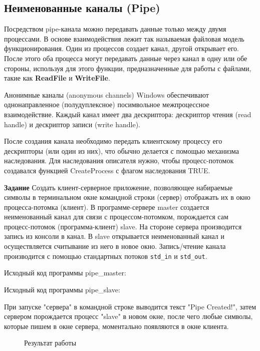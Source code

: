 \documentclass[a4paper]{article}
\begin{document}
\subsection{Неименованные каналы (Pipe)}
	Посредством pipe-канала можно передавать данные только между двумя процессами. В основе взаимодействия лежит так называемая файловая модель функционирования. Один из процессов создает канал, другой открывает его. После этого оба процесса могут передавать данные через канал в одну или обе стороны, используя для этого функции, предназначенные для работы с файлами, такие как \textbf{ReadFile} и \textbf{WriteFile}.
	
	Анонимные каналы (anonymous channels) Windows обеспечивают однонаправленное (полудуплексное) посимвольное межпроцессное взаимодействие. Каждый канал имеет два дескриптора: дескриптор чтения (read handle) и дескриптор записи (write handle).
	
	После создания канала необходимо передать клиентскому процессу его дескрипторы (или один из них), что обычно делается с помощью механизма наследования. Для наследования описателя нужно, чтобы процесс-потомок создавался функцией CreateProcess с флагом наследования TRUE.
	
	\textbf{Задание} Создать клиент-серверное приложение, позволяющее набираемые символы в терминальном окне командной строки (сервер) отображать их в окно процесса-потомка (клиент).
В программе-сервере master создается неименованный канал для связи с процессом-потомком, порождается сам процесс-потомок (программа-клиент) slave. На стороне сервера производится запись из консоли в канал. В slave открывается неименованный канал и осуществляется считывание из него в новое окно. Запись/чтение канала производится с помощью стандартных потоков \texttt{std\_in} и \texttt{std\_out}.

	Исходный код программы pipe\_master:
	
	
	
	Исходный код программы pipe\_slave:
	
	
	При запуске "сервера" в командной строке выводится текст "Pipe Created!", затем сервером порождается процесс "slave" в новом окне, после чего любые символы, которые пишем в окне сервера, моментально появляются в окне клиента.
	\begin{figure}[h!]
		\caption{Результат работы}
		\label{img:task1}
	\end{figure}
	
\end{document}
